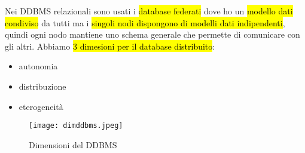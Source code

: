Nei DDBMS relazionali sono usati i \hl{database federati} dove ho un \hl{modello dati condiviso} da tutti ma i \hl{singoli nodi dispongono di modelli dati indipendenti}, quindi ogni nodo mantiene uno schema generale che permette di comunicare con gli altri. Abbiamo \hl{3 dimesioni per il database distribuito}:

\begin{itemize}
    \item autonomia
    \item distribuzione
    \item eterogeneità
\end{itemize}


\begin{figure}[H]
\centering
\texttt{[image: dimddbms.jpeg]}
\caption{Dimensioni del DDBMS} 
\label{dimddbms}
\end{figure}


